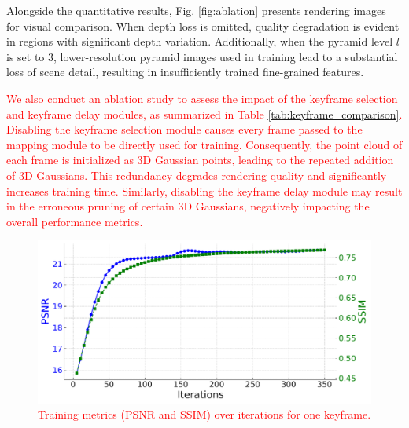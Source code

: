 \documentclass[lettersize,journal]{IEEEtran}
\begin{document}
Alongside the quantitative results, Fig. \ref{fig:ablation} presents rendering images for visual comparison. When depth loss is omitted, quality degradation is evident in regions with significant depth variation. Additionally, when the pyramid level $l$ is set to 3, lower-resolution pyramid images used in training lead to a substantial loss of scene detail, resulting in insufficiently trained fine-grained features.


\textcolor{red}{We also conduct an ablation study to assess the impact of the keyframe selection and keyframe delay modules, as summarized in Table \ref{tab:keyframe_comparison}. Disabling the keyframe selection module causes every frame passed to the mapping module to be directly used for training. Consequently, the point cloud of each frame is initialized as 3D Gaussian points, leading to the repeated addition of 3D Gaussians. This redundancy degrades rendering quality and significantly increases training time. Similarly, disabling the keyframe delay module may result in the erroneous pruning of certain 3D Gaussians, negatively impacting the overall performance metrics.}


\begin{figure}
    \centering
    \includegraphics[width=0.9\columnwidth]{image/runtime/runtimechart.pdf}
    \caption{ \textcolor{red}{Training metrics (PSNR and SSIM) over iterations for one keyframe.}}
    \label{fig:psnrssim}
\end{figure}
\end{document}
